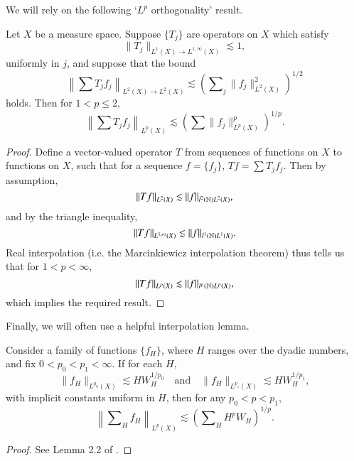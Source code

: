 We will rely on the following `$L^p$ orthogonality' result.

\begin{lemma} \label{lem:LpOrthogonalityEasyLemma}
    Let $X$ be a measure space. Suppose $\{ T_j \}$ are operators on $X$ which satisfy
    \[ \| T_j \|_{L^1(X) \to L^{1,\infty}(X)} \lesssim 1, \]
    uniformly in $j$, and suppose that the bound
    \[ \left\| \sum T_j f_j \right\|_{L^2(X) \to L^2(X)} \lesssim \left( \sum\nolimits_j \| f_j \|_{L^2(X)}^2 \right)^{1/2} \]
    holds. Then for $1 < p \leq 2$,
    \[ \left\| \sum T_j f_j \right\|_{L^p(X)} \lesssim \left( \sum \| f_j \|_{L^p(X)}^p \right)^{1/p}. \]
\end{lemma}
\begin{proof}
    Define a vector-valued operator $T$ from sequences of functions on $X$ to functions on $X$, such that for a sequence $f = \{ f_j \}$, $Tf = \sum T_j f_j$. Then by assumption,
    \begin{equation}
        \| Tf \|_{L^2(X)} \lesssim \| f \|_{l^2(\operatorname{\mathbb{N}}) L^2(X)},
    \end{equation}
    and by the triangle inequality,
    \begin{equation}
        \| Tf \|_{L^{1,\infty}(X)} \lesssim \| f \|_{l^1(\operatorname{\mathbb{N}}) L^1(X)}.
    \end{equation}
    Real interpolation (i.e. the Marcinkiewicz interpolation theorem) thus tells us that for $1 < p < \infty$,
    \begin{equation}
        \| Tf \|_{L^p(X)} \lesssim \| f \|_{l^p(\operatorname{\mathbb{N}}) L^p(X)},
    \end{equation}
    which implies the required result.
\end{proof}

Finally, we will often use a helpful interpolation lemma.

\begin{lemma} \label{theoremrealinterpolation}
    Consider a family of functions $\{ f_H \}$, where $H$ ranges over the dyadic numbers, and fix $0 < p_0 < p_1 < \infty$. If for each $H$,
    \[ \| f_H \|_{L^{p_0}(X)} \lesssim H W_H^{1/p_0} \quad\text{and}\quad \| f_H \|_{L^{p_1}(X)} \lesssim H W_H^{1/p_1}, \]
    with implicit constants uniform in $H$, then for any $p_0 < p < p_1$,
    \[ \left\| \sum\nolimits_H f_H \right\|_{L^p(X)} \lesssim \left( \sum\nolimits_H H^p W_H \right)^{1/p}. \]
\end{lemma}
\begin{proof}
    See Lemma 2.2 of \cite{HeoandNazarovandSeeger}.
\end{proof}

